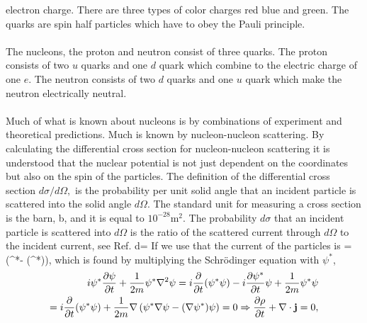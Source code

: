 electron charge.  There are three types of color charges red blue and
green. The quarks are spin half particles which have to obey the Pauli principle.\\
\\
The nucleons, the proton and neutron consist of three quarks. The proton
consists of two $u$ quarks and one $d$ quark which combine to the electric
charge of one $e$. The neutron consists of two $d$ quarks and one $u$ quark
which make the neutron electrically neutral.\\
\\
Much of what is known about nucleons is by combinations of experiment and 
theoretical predictions. Much is known by nucleon-nucleon scattering. 
By calculating the differential cross section for nucleon-nucleon 
scattering it is understood that the nuclear potential is not just dependent on 
the coordinates but also on the spin of the particles.
The definition of the differential cross section $d\sigma/d\Omega,$ is the probability per unit solid angle that an incident particle is scattered into the
solid angle $d\Omega.$ The standard unit for measuring a cross section is the barn, b, and it is equal to $10^{-28}$m$^2$. The probability $d\sigma$ that an incident particle is 
scattered into $d\Omega$ is the ratio of the scattered current through $d\Omega$
to the incident current, see Ref. \cite{kraneintro}
\be
d\sigma = 
\label{Eq:crossec}
\ee
If we use that the current of the particles is
\be
{}= (\psi^*\nabla \psi- (\nabla\psi^*)\psi),
\ee
which is found by multiplying the Schr\"odinger equation with $\psi^*$,
\begin{equation*}
		\begin{split}
		i\psi^*\frac{\partial\psi}{\partial t}+\frac{1}{2m}
		\psi^*\nabla^2 \psi= i\frac{\partial}{\partial t}(\psi^*\psi)
		-i\frac{\partial \psi^*}{\partial t}\psi+\frac{1}{2m}\psi^*\psi\\
		=i\frac{\partial}{\partial t}(\psi^*\psi)+\frac{1}{2m}\nabla\left(\psi^*\nabla\psi-(\nabla\psi^*)\psi\right)=0\Rightarrow \frac{\partial \rho}{\partial t}+\bold{\nabla}\cdot \bold{j}=0,
\end{split}
\end{equation*}
